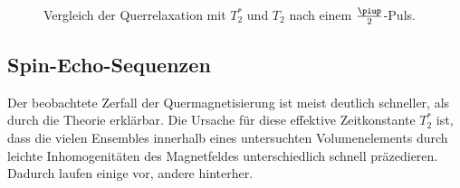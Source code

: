 \documentclass[
    11pt,
    ngerman
]{scrreprt}
\begin{document}
\begin{figure}[htbp]
    \begin{minipage}[htbp]{.45\textwidth}
        \centering
        \caption{%
            Sättigungsrückgewinnung nach einem $\frac\piup2$-Puls.
    }
\end{minipage}
\hfill
\begin{minipage}[htbp]{.45\textwidth}
    \centering
    \caption{%
        Vergleich der Querrelaxation mit $T_2^*$ und $T_2$ nach einem $\frac\piup2$-Puls. 
    }
\end{minipage}
\end{figure}


\subsection{Spin-Echo-Sequenzen}

Der beobachtete Zerfall der Quermagnetisierung ist meist deutlich schneller,
als durch die Theorie erklärbar. Die Ursache für diese effektive Zeitkonstante
$T_2^*$ ist, dass die vielen Ensembles innerhalb eines untersuchten
Volumenelements durch leichte Inhomogenitäten des Magnetfeldes unterschiedlich
schnell präzedieren. Dadurch laufen einige vor, andere hinterher.
\end{document}
